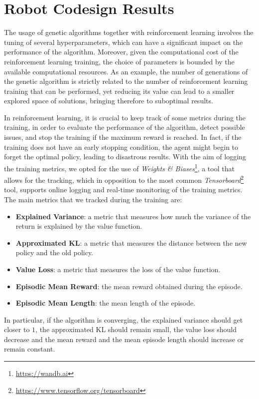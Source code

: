 \section{Robot Codesign Results}

The usage of genetic algorithms together with reinforcement learning involves the tuning of several hyperparameters, which can have a significant impact on the performance of the algorithm. Moreover, given the computational cost of the reinforcement learning training, the choice of parameters is bounded by the available computational resources. As an example, the number of generations of the genetic algorithm is strictly related to the number of reinforcement learning training that can be performed, yet reducing its value can lead to a smaller explored space of solutions, bringing therefore to suboptimal results.

In reinforcement learning, it is crucial to keep track of some metrics during the training, in order to evaluate the performance of the algorithm, detect possible issues, and stop the training if the maximum reward is reached. In fact, if the training does not have an early stopping condition, the agent might begin to forget the optimal policy, leading to disastrous results. With the aim of logging the training metrics, we opted for the use of \textit{Weights {\&} Biases}\footnote{\url{https://wandb.ai}}, a tool that allows for the tracking, which in opposition to the most common \textit{Tensorboard}\footnote{\url{https://www.tensorflow.org/tensorboard}} tool, supports online logging and real-time monitoring of the training metrics. The main metrics that we tracked during the training are:

\begin{itemize}
    \item \textbf{Explained Variance}: a metric that measures how much the variance of the return is explained by the value function.
    \item \textbf{Approximated KL}: a metric that measures the distance between the new policy and the old policy.
    \item \textbf{Value Loss}: a metric that measures the loss of the value function.
    \item \textbf{Episodic Mean Reward}: the mean reward obtained during the episode.
    \item \textbf{Episodic Mean Length}: the mean length of the episode.
\end{itemize}

In particular, if the algorithm is converging, the explained variance should get closer to $1$, the approximated KL should remain small, the value loss should decrease and the mean reward and the mean episode length should increase or remain constant.

